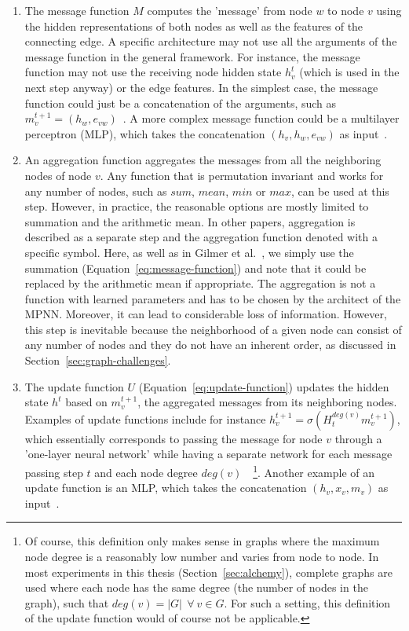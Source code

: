 \begin{enumerate}
	\item The message function $M$ computes the 'message' from node $w$ to node $v$ using the hidden representations of both nodes as well as the features of the connecting edge. A specific architecture may not use all the arguments of the message function in the general framework. For instance, the message function may not use the receiving node hidden state $h_v^t$ (which is used in the next step anyway) or the edge features. In the simplest case, the message function could just be a concatenation of the arguments, such as $m_v^{t+1} = (h_w, e_{vw})$~\cite{Duvenaud2015}. A more complex message function could be a multilayer perceptron (MLP), which takes the concatenation $(h_v, h_w, e_{vw})$ as input~\cite{Battaglia2016}.
	
	\item An aggregation function aggregates the messages from all the neighboring nodes of node $v$. Any function that is permutation invariant and works for any number of nodes, such as $sum$, $mean$, $min$ or $max$, can be used at this step. However, in practice, the reasonable options are mostly limited to summation and the arithmetic mean.	
	In other papers, aggregation is described as a separate step and the aggregation function denoted with a specific symbol. Here, as well as in Gilmer et al.~\cite{Gilmer2017}, we simply use the summation (Equation~\ref{eq:message-function}) and note that it could be replaced by the arithmetic mean if appropriate.
	The aggregation is not a function with learned parameters and has to be chosen by the architect of the MPNN. Moreover, it can lead to considerable loss of information. However, this step is inevitable because the neighborhood of a given node can consist of any number of nodes and they do not have an inherent order, as discussed in Section~\ref{sec:graph-challenges}.
	
	\item The update function $U$ (Equation~\ref{eq:update-function}) updates the hidden state $h^t$ based on  $m_v^{t+1}$, the aggregated messages from its neighboring nodes. Examples of update functions include for instance $h_v^{t+1} = \sigma(H_t^{deg(v)} m_v^{t+1})$, which essentially corresponds to passing the message for node $v$ through a 'one-layer neural network' while having a separate network for each message passing step $t$ and each node degree $deg(v)$~\cite{Duvenaud2015}~\footnote{
		Of course, this definition only makes sense in graphs where the maximum node degree is a reasonably low number  and varies from node to node. In most experiments in this thesis (Section~\ref{sec:alchemy}), complete graphs are used where each node has the same degree (the number of nodes in the graph), such that $deg(v) =|G|~~ \forall~ v \in G$. For such a setting, this definition of the update function would of course not be applicable.
	}. Another example of an update function is an MLP, which takes the concatenation $(h_v, x_v, m_v)$ as input~\cite{Battaglia2016}.
\end{enumerate}

